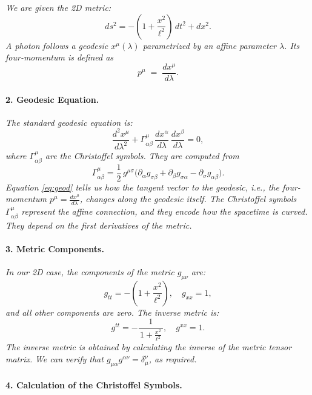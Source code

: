 \documentclass{article}
\begin{document}
\textit{We are given the 2D metric:}
\begin{equation*}
ds^2 
= -\left(1 + \frac{x^2}{\ell^2}\right)\,dt^2 
+ dx^2.
\end{equation*}
\textit{A photon follows a geodesic \(x^\mu(\lambda)\) parametrized by an affine parameter \(\lambda\). Its four-momentum is defined as}
\[
p^\mu \;=\; \frac{dx^\mu}{d\lambda}.
\]

\paragraph{2. Geodesic Equation.}

\textit{The standard geodesic equation is:}
\begin{equation}\label{eq:geod}
\frac{d^2 x^\mu}{d\lambda^2} 
+ \Gamma^\mu_{\alpha\beta}\,\frac{dx^\alpha}{d\lambda}\,\frac{dx^\beta}{d\lambda} 
= 0,
\end{equation}
\textit{where \(\Gamma^\mu_{\alpha\beta}\) are the Christoffel symbols. They are computed from}
\begin{equation*}\label{eq:christoffel}
\Gamma^\mu_{\alpha\beta}
= \frac{1}{2}\,g^{\mu\sigma}
\bigl(\partial_\alpha g_{\sigma\beta}
+ \partial_\beta g_{\sigma\alpha}
- \partial_\sigma g_{\alpha\beta}\bigr).
\end{equation*}
\textit{Equation \eqref{eq:geod} tells us how the tangent vector to the geodesic, i.e., the four-momentum \(p^\mu = \frac{dx^\mu}{d\lambda}\), changes along the geodesic itself. The Christoffel symbols \(\Gamma^\mu_{\alpha\beta}\) represent the affine connection, and they encode how the spacetime is curved. They depend on the first derivatives of the metric.}

\paragraph{3. Metric Components.}

\textit{In our 2D case, the components of the metric \(g_{\mu\nu}\) are:}
\[
g_{tt} = -\left(1 + \frac{x^2}{\ell^2}\right), 
\quad
g_{xx} = 1,
\]
\textit{and all other components are zero. The inverse metric is:}
\[
g^{tt} 
= -\frac{1}{\,1 + \frac{x^2}{\ell^2}\,}, 
\quad
g^{xx} 
= 1.
\]
\textit{The inverse metric is obtained by calculating the inverse of the metric tensor matrix.} \emph{We can verify that \(g_{\mu\alpha}g^{\alpha\nu} = \delta_\mu^\nu\), as required.}

\paragraph{4. Calculation of the Christoffel Symbols.}
\end{document}
